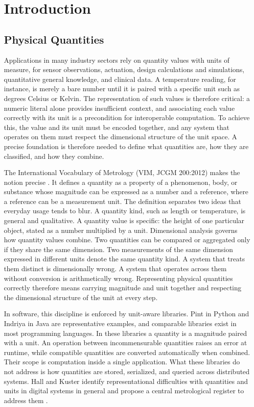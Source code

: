 \chapter{Introduction}
\section{Physical Quantities}

Applications in many industry sectors rely on quantity values with units of measure, for sensor observations, actuation, design calculations and simulations, quantitative general knowledge, and clinical data. A temperature reading, for instance, is merely a bare number until it is paired with a specific unit such as degrees Celsius or Kelvin. The representation of such values is therefore critical: a numeric literal alone provides insufficient context, and associating each value correctly with its unit is a precondition for interoperable computation. To achieve this, the value and its unit must be encoded together, and any system that operates on them must respect the dimensional structure of the unit space. A precise foundation is therefore needed to define what quantities are, how they are classified, and how they combine.

The International Vocabulary of Metrology (VIM, JCGM 200:2012) makes the notion precise \cite{jcgm2012international}. It defines a quantity as a property of a phenomenon, body, or substance whose magnitude can be expressed as a number and a reference, where a reference can be a measurement unit. The definition separates two ideas that everyday usage tends to blur. A quantity kind, such as length or temperature, is general and qualitative. A quantity value is specific: the height of one particular object, stated as a number multiplied by a unit. Dimensional analysis governs how quantity values combine. Two quantities can be compared or aggregated only if they share the same dimension. Two measurements of the same dimension expressed in different units denote the same quantity kind. A system that treats them distinct is dimensionally wrong. A system that operates across them without conversion is arithmetically wrong. Representing physical quantities correctly therefore means carrying magnitude and unit together and respecting the dimensional structure of the unit at every step.


In software, this discipline is enforced by unit-aware libraries. Pint in Python and Indriya in Java are representative examples, and comparable libraries exist in most programming languages. In these libraries a quantity is a magnitude paired with a unit. An operation between incommensurable quantities raises an error at runtime, while compatible quantities are converted automatically when combined. Their scope is computation inside a single application. What these libraries do not address is how quantities are stored, serialized, and queried across distributed systems. Hall and Kuster identify representational difficulties with quantities and units in digital systems in general and propose a central metrological register to address them \cite{hall2022representing}.


